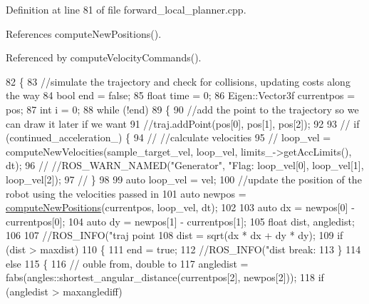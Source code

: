 Definition at line 81 of file forward\+\_\+local\+\_\+planner.\+cpp.



References compute\+New\+Positions().



Referenced by compute\+Velocity\+Commands().


\begin{DoxyCode}
82 \{
83     \textcolor{comment}{//simulate the trajectory and check for collisions, updating costs along the way}
84     \textcolor{keywordtype}{bool} end = \textcolor{keyword}{false};
85     \textcolor{keywordtype}{float} time = 0;
86     Eigen::Vector3f currentpos = pos;
87     \textcolor{keywordtype}{int} i = 0;
88     \textcolor{keywordflow}{while} (!end)
89     \{
90         \textcolor{comment}{//add the point to the trajectory so we can draw it later if we want}
91         \textcolor{comment}{//traj.addPoint(pos[0], pos[1], pos[2]);}
92 
93         \textcolor{comment}{// if (continued\_acceleration\_) \{}
94         \textcolor{comment}{//   //calculate velocities}
95         \textcolor{comment}{//   loop\_vel = computeNewVelocities(sample\_target\_vel, loop\_vel, limits\_->getAccLimits(), dt);}
96         \textcolor{comment}{//   //ROS\_WARN\_NAMED("Generator", "Flag: %
       loop\_vel[0], loop\_vel[1], loop\_vel[2]);}
97         \textcolor{comment}{// \}}
98 
99         \textcolor{keyword}{auto} loop\_vel = vel;
100         \textcolor{comment}{//update the position of the robot using the velocities passed in}
101         \textcolor{keyword}{auto} newpos = \hyperlink{classcl__move__base__z_1_1forward__local__planner_1_1ForwardLocalPlanner_a07074f6a5a6cc1de035e09822d647158}{computeNewPositions}(currentpos, loop\_vel, dt);
102 
103         \textcolor{keyword}{auto} dx = newpos[0] - currentpos[0];
104         \textcolor{keyword}{auto} dy = newpos[1] - currentpos[1];
105         \textcolor{keywordtype}{float} dist, angledist;
106 
107         \textcolor{comment}{//ROS\_INFO("traj point %
108         dist = sqrt(dx * dx + dy * dy);
109         \textcolor{keywordflow}{if} (dist > maxdist)
110         \{
111             end = \textcolor{keyword}{true};
112             \textcolor{comment}{//ROS\_INFO("dist break: %
113         \}
114         \textcolor{keywordflow}{else}
115         \{
116             \textcolor{comment}{// ouble from, double to}
117             angledist = fabs(angles::shortest\_angular\_distance(currentpos[2], newpos[2]));
118             \textcolor{keywordflow}{if} (angledist > maxanglediff)
}}
\end{DoxyCode}
